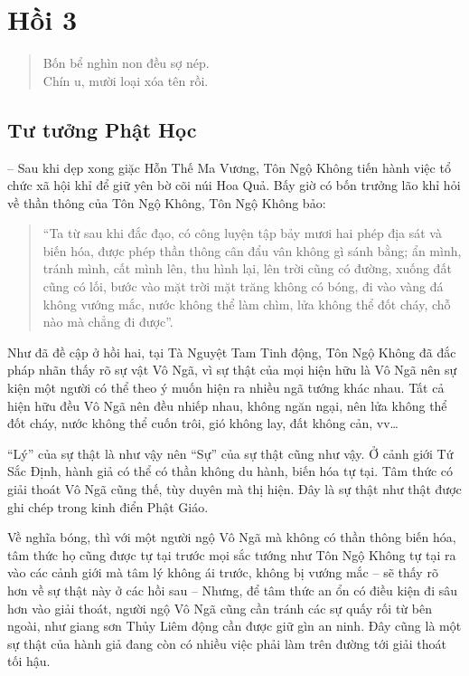 \chapter{Hồi 3} %
\label{cha:hoi_3}

\begin{verse}
\begin{itshape}
Bốn bể nghìn non đều sợ nép.\\
Chín u, mười loại xóa tên rồi.
\end{itshape}
\end{verse}

\section{Tư tưởng Phật Học} %
\label{sec:3_phat_hoc}

-- Sau khi dẹp xong giặc Hỗn Thế Ma Vương, Tôn Ngộ Không tiến hành việc tổ chức xã hội khỉ để giữ yên bờ cõi núi Hoa Quả. Bấy giờ có bốn trưởng lão khỉ hỏi về thần thông của Tôn Ngộ Không, Tôn Ngộ Không bảo:

\begin{quote}
\begin{itshape}
``Ta từ sau khi đắc đạo, có công luyện tập bảy mươi hai phép địa sát và biến hóa, được phép thần thông cân đẩu vân không gì sánh bằng; ẩn mình, tránh mình, cất mình lên, thu hình lại, lên trời cũng có đường, xuống đất cũng có lối, bước vào mặt trời mặt trăng không có bóng, đi vào vàng đá không vướng mắc, nước không thể làm chìm, lửa không thể đốt cháy, chỗ nào mà chẳng đi được''.
\end{itshape}
\end{quote}

Như đã đề cập ở hồi hai, tại Tà Nguyệt Tam Tinh động, Tôn Ngộ Không đã đắc pháp nhãn thấy rõ sự vật Vô Ngã, vì sự thật của mọi hiện hữu là Vô Ngã nên sự kiện một người có thể theo ý muốn hiện ra nhiều ngã tướng khác nhau. Tất cả hiện hữu đều Vô Ngã nên đều nhiếp nhau, không ngăn ngại, nên lửa không thể đốt cháy, nước không thể cuốn trôi, gió không lay, đất không cản, vv\ldots

``Lý'' của sự thật là như vậy nên ``Sự'' của sự thật cũng như vậy. Ở cảnh giới Tứ Sắc Định, hành giả có thể có thần không du hành, biến hóa tự tại. Tâm thức có giải thoát Vô Ngã cũng thế, tùy duyên mà thị hiện. Đây là sự thật như thật được ghi chép trong kinh điển Phật Giáo.

Về nghĩa bóng, thì với một người ngộ Vô Ngã mà không có thần thông biến hóa, tâm thức họ cũng được tự tại trước mọi sắc tướng như Tôn Ngộ Không tự tại ra vào các cảnh giới mà tâm lý không ái trước, không bị vướng mắc -- sẽ thấy rõ hơn về sự thật này ở các hồi sau -- Nhưng, để tâm thức an ổn có điều kiện đi sâu hơn vào giải thoát, người ngộ Vô Ngã cũng cần tránh các sự quấy rối từ bên ngoài, như giang sơn Thủy Liêm động cần được giữ gìn an ninh. Đây cũng là một sự thật của hành giả đang còn có nhiều việc phải làm trên đường tới giải thoát tối hậu.

